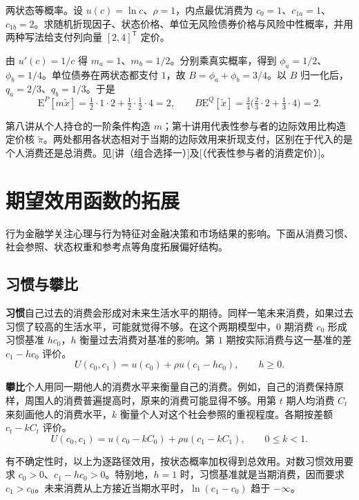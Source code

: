 \begin{tcolorbox}[example,title=补充算例：同一证券的两种定价写法]
\begin{question}
两状态等概率。设 $u(c)=\ln c$、$\rho=1$，内点最优消费为 $c_0=1$、$c_{1a}=1$、$c_{1b}=2$。求随机折现因子、状态价格、单位无风险债券价格与风险中性概率，并用两种写法给支付列向量 $[2,4]^{\mathsf T}$ 定价。
\end{question}
\begin{solution}[blank-type=manual,blank-vsep=5\baselineskip]
由 $u'(c)=1/c$ 得 $m_a=1$、$m_b=1/2$。分别乘真实概率，得到 $\phi_a=1/2$、$\phi_b=1/4$。单位债券在两状态都支付 $1$，故 $B=\phi_a+\phi_b=3/4$。以 $B$ 归一化后，$q_a=2/3$、$q_b=1/3$。于是
\[
 \mathrm E^P[m\tilde x]=\tfrac12\cdot1\cdot2+\tfrac12\cdot\tfrac12\cdot4=2,
 \qquad B\mathrm E^Q[\tilde x]=\tfrac34\bigl(\tfrac23\cdot2+\tfrac13\cdot4\bigr)=2.
\]
\end{solution}
\end{tcolorbox}

第八讲从个人持仓的一阶条件构造 $m$；第十讲用代表性参与者的边际效用比构造定价核 $\widetilde\pi$。两处都用各状态相对于当期的边际效用来折现支付，区别在于代入的是个人消费还是总消费。见[讲（组合选择一）]及[（代表性参与者的消费定价）]。

\section{期望效用函数的拓展}\label{sec:wj-six-extensions}
行为金融学关注心理与行为特征对金融决策和市场结果的影响。下面从消费习惯、社会参照、状态权重和参考点等角度拓展偏好结构。
\subsection{习惯与攀比}
\begin{tcolorbox}[knowledge,title=习惯与社会参照]
\textbf{习惯}\quad 自己过去的消费会形成对未来生活水平的期待。同样一笔未来消费，如果过去习惯了较高的生活水平，可能就觉得不够。在这个两期模型中，$0$ 期消费 $c_0$ 形成习惯基准 $hc_0$，$h$ 衡量过去消费对基准的影响。第 $1$ 期按实际消费与这一基准的差 $c_1-hc_0$ 评价。
\[
 U(c_0,c_1)=u(c_0)+\rho u(c_1-hc_0),\qquad h\ge0.
\]

\textbf{攀比}\quad 个人用同一期他人的消费水平来衡量自己的消费。例如，自己的消费保持原样，周围人的消费普遍提高时，原来的消费可能显得不够。用第 $t$ 期人均消费 $C_t$ 来刻画他人的消费水平，$k$ 衡量个人对这个社会参照的重视程度。各期按差额 $c_t-kC_t$ 评价。
\[
 U(c_0,c_1)=u(c_0-kC_0)+\rho u(c_1-kC_1),\qquad 0\le k<1.
\]
\end{tcolorbox}
有不确定性时，以上为逐路径效用，按状态概率加权得到总效用。对数习惯效用要求 $c_0>0$、$c_1-hc_0>0$。特别地，$h=1$ 时，习惯基准就是当期消费，因而要求 $c_1>c_0$。未来消费从上方接近当期水平时，$\ln(c_1-c_0)$ 趋于 $-\infty$。


